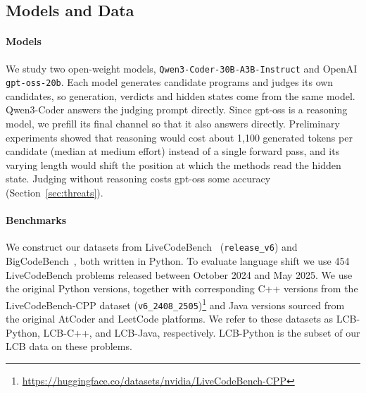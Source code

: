 

\subsection{Models and Data}
\label{sec:setup-data}

\paragraph{Models}
We study two open-weight models, \texttt{Qwen3-Coder-30B-A3B-Instruct} and
OpenAI \texttt{gpt-oss-20b}. Each model generates candidate programs and judges its own candidates, so generation, verdicts and hidden states come from the same model. 
Qwen3-Coder answers the judging prompt directly. 
Since gpt-oss is a reasoning model, we prefill its final channel so that it also answers directly. 
Preliminary experiments showed that reasoning would cost about 1{,}100 generated tokens per candidate (median at medium effort) instead of a single forward pass, and its varying
length would shift the position at which the methods read the hidden state.
Judging without reasoning costs gpt-oss some accuracy (Section~\ref{sec:threats}).

\paragraph{Benchmarks}
We construct our datasets from LiveCodeBench~\cite{Jain2025Livecodebench} (\texttt{release\_v6}) and BigCodeBench~\cite{Zhuo2025BCB}, both written in Python. 
To evaluate  language shift we use 454 LiveCodeBench problems released between October 2024 and May 2025. We use the original Python versions, together with corresponding C++ versions from the LiveCodeBench-CPP dataset (\texttt{v6\_2408\_2505})\footnote{\url{https://huggingface.co/datasets/nvidia/LiveCodeBench-CPP}} and Java versions sourced from the original AtCoder and LeetCode platforms. We refer to these datasets as LCB-Python, LCB-C++, and LCB-Java, respectively. LCB-Python is the subset of our LCB data on these problems.



